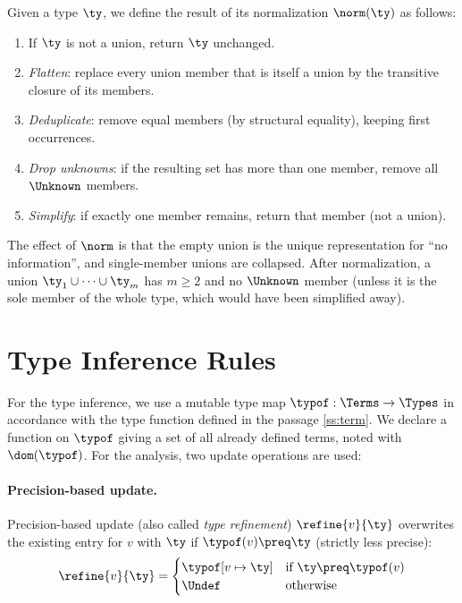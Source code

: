 Given a type $\ty$, we define the result of its normalization $\norm(\ty)$ as follows:
\begin{enumerate}
  \item If $\ty$ is not a union, return $\ty$ unchanged.
  \item \emph{Flatten}: replace every union member that is itself a union by the transitive closure of its members.
  \item \emph{Deduplicate}: remove equal members (by structural equality), keeping first occurrences.
  \item \emph{Drop unknowns}: if the resulting set has more than one member, remove all $\Unknown$ members.
  \item \emph{Simplify}: if exactly one member remains, return that member (not a union).
\end{enumerate}

The effect of $\norm$ is that the empty union is the unique representation for ``no information'', and single-member unions are collapsed.
After normalization, a union $\ty_1 \cup \cdots \cup \ty_m$ has $m \geq 2$ and no $\Unknown$ member (unless it is the sole member of the whole type, which would have been simplified away).

\section{Type Inference Rules}
\label{sec:inference}

For the type inference, we use a mutable type map $\typof: \Terms \to \Types$ in accordance with the type function defined in the passage \ref{ss:term}.
We declare a function on $\typof$ giving a set of all already defined terms, noted with $\dom(\typof)$.
For the analysis, two update operations are used:

\paragraph{Precision-based update.}
Precision-based update (also called \emph{type refinement}) $\refine{v}{\ty}$ overwrites the existing entry for $v$ with $\ty$ if $\typof(v) \preq \ty$ (strictly less precise):
\[
\refine{v}{\ty} =
\begin{cases}
\typof[v \mapsto \ty] & \text{if } \ty \preq \typof(v) \\
\Undef & \text{otherwise}
\end{cases}
\]

